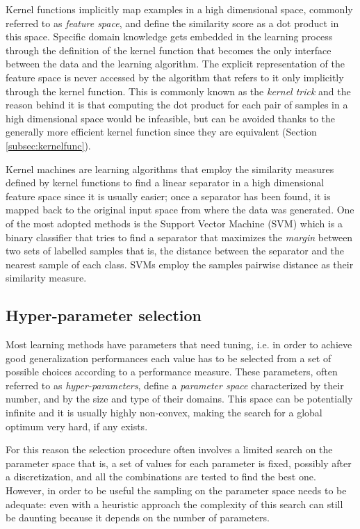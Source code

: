 Kernel functions implicitly map examples in a high dimensional space, commonly
referred to as \emph{feature space}, and define the similarity score as a dot
product in this space.
Specific domain knowledge gets embedded in the learning process through the definition
of the kernel function that becomes the only interface between the data
and the learning algorithm.
The explicit representation of the feature space is never accessed by the algorithm
that refers to it only implicitly through the kernel function.
This is commonly known as the \emph{kernel trick} and the reason behind it is 
that computing the dot product for each pair of samples in a high dimensional space
would be infeasible, but can be avoided thanks to the generally more efficient
kernel function since they are equivalent (Section \ref{subsec:kernelfunc}).

Kernel machines are learning algorithms that employ the similarity measures defined
by kernel functions to find a linear separator in a high dimensional feature space
since it is usually easier; once a separator has been found, it is mapped back
to the original input space from where the data was generated.
One of the most adopted methods is the Support Vector Machine (SVM) \cite{Cortes&Vapnik:1995}
which is a binary classifier that tries to find a separator that maximizes the \emph{margin}
between two sets of labelled samples that is, the distance between the separator and the
nearest sample of each class.
SVMs employ the samples pairwise distance as their similarity measure.

\subsection{Hyper-parameter selection}
\label{subsec:hyper1}

Most learning methods have parameters that need tuning, i.e. in order to achieve
good generalization performances each value has to be selected from a set of
possible choices according to a performance measure.
These parameters, often referred to as \emph{hyper-parameters}, define a
\emph{parameter space} characterized by their number, and by the size and type
of their domains.
This space can be potentially infinite and it is usually highly non-convex, making
the search for a global optimum very hard, if any exists.

For this reason the selection procedure often involves a limited search on the parameter space
that is, a set of values for each parameter is fixed, possibly after a discretization,
and all the combinations are tested to find the best one.
However, in order to be useful the sampling on the parameter space needs to be adequate:
even with a heuristic approach the complexity of this search can still be daunting because
it depends on the number of parameters.

